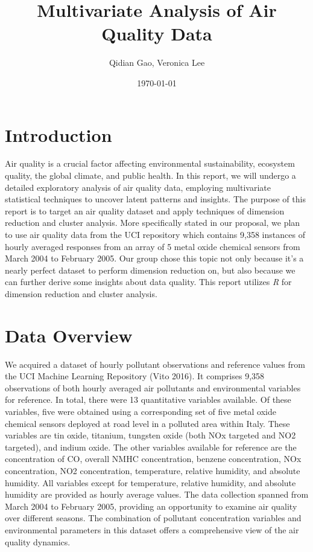 \documentclass{article}
\title{Multivariate Analysis of Air Quality Data}
\author{Qidian Gao, Veronica Lee}
\date{\today}
\begin{document}
\maketitle

\section{Introduction}
Air quality is a crucial factor affecting environmental sustainability, ecosystem quality, the global climate, and public health. In this report, we will undergo a detailed exploratory analysis of air quality data, employing multivariate statistical techniques to uncover latent patterns and insights. The purpose of this report is to target an air quality dataset and apply techniques of dimension reduction and cluster analysis. More specifically stated in our proposal, we plan to use air quality data from the UCI repository which contains 9,358 instances of hourly averaged responses from an array of 5 metal oxide chemical sensors from March 2004 to February 2005. Our group chose this topic not only because it's a nearly perfect dataset to perform dimension reduction on, but also because we can further derive some insights about data quality. This report utilizes \textit{R} for dimension reduction and cluster analysis.

\section{Data Overview}
We acquired a dataset of hourly pollutant observations and reference values from the UCI Machine Learning Repository (Vito 2016). It comprises 9,358 observations of both hourly averaged air pollutants and environmental variables for reference. In total, there were 13 quantitative variables available. Of these variables, five were obtained using a corresponding set of five metal oxide chemical sensors deployed at road level in a polluted area within Italy. These variables are tin oxide, titanium, tungsten oxide (both NOx targeted and NO2 targeted), and indium oxide. The other variables available for reference are the concentration of CO, overall NMHC concentration, benzene concentration, NOx concentration, NO2 concentration, temperature, relative humidity, and absolute humidity. All variables except for temperature, relative humidity, and absolute humidity are provided as hourly average values. The data collection spanned from March 2004 to February 2005, providing an opportunity to examine air quality over different seasons. The combination of pollutant concentration variables and environmental parameters in this dataset offers a comprehensive view of the air quality dynamics.
\end{document}
